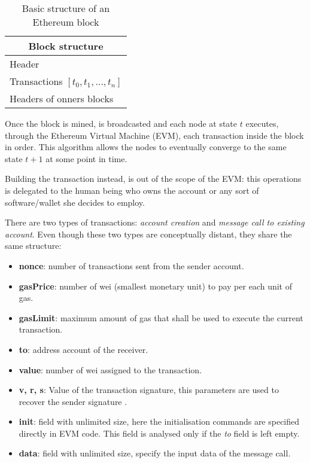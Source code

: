 \begin{table}[h!]
\centering
\begin{tabular}{ |p{3cm}|  }
\hline
\multicolumn{1}{|c|}{Block structure} \\
\hline
\hline
Header \\
\hline
Transactions $[t_0,t_1,...,t_n]$ \\
\hline
Headers of onners blocks\\
\hline
\end{tabular}
\caption{Basic structure of an Ethereum block}
\label{table:2}
\end{table}

Once the block is mined, is broadcasted and each node at state $t$  executes, through the Ethereum Virtual Machine (EVM), each transaction inside the block in order.
This algorithm allows the nodes to eventually converge to the same state $t+1$ at some point in time.

Building the transaction instead, is out of the scope of the EVM: this operations is delegated to the human being who owns the account or any sort of software/wallet she decides to employ.

There are two types of transactions: \textit{account creation} and \textit{message call to existing account}. Even though these two types are conceptually distant, they share the same structure:

\begin{itemize}
  \item \textbf{nonce}: number of transactions sent from the sender account.
  \item \textbf{gasPrice}: number of wei (smallest monetary unit) to pay per each unit of gas.
  \item \textbf{gasLimit}: maximum amount of gas that shall be used to execute the current transaction.
  \item \textbf{to}: address account of the receiver.
  \item \textbf{value}: number of wei assigned to the transaction.
  \item \textbf{v, r, s}: Value of the transaction signature, this parameters are used to recover the sender signature \cite{gura2004comparing}.
  \item \textbf{init}: field with unlimited size, here the initialisation commands are specified directly in EVM code. This field is analysed only if the \textit{to} field is left empty.
  \item \textbf{data}: field with unlimited size, specify the input data of the message call.
\end{itemize}

